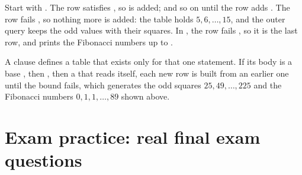 \documentclass[10pt]{scrartcl}
\begin{document}
\begin{example*}
Start with . The row  satisfies , so  is added; and so on until the row  adds . The row  fails , so nothing more is added: the table holds $5,6,\dots,15$, and the outer query keeps the odd values with their squares. In , the row  fails , so it is the last row, and  prints the Fibonacci numbers up to .
\end{example*}

\revisit A  clause defines a table that exists only for that one statement. If its body is a base , then , then a  that reads  itself, each new row is built from an earlier one until the  bound fails, which generates the odd squares $25, 49, \dots, 225$ and the Fibonacci numbers $0, 1, 1, \dots, 89$ shown above.

\section{Exam practice: real final exam questions}
\end{document}
